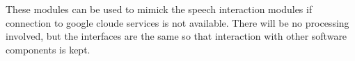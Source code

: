 These modules can be used to mimick the speech interaction modules if connection to google cloude services is not available. There will be no processing involved, but the interfaces are the same so that interaction with other software components is kept. 